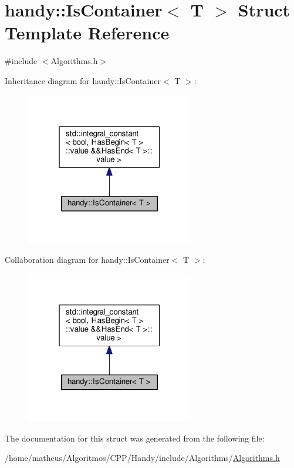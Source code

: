 \hypertarget{structhandy_1_1IsContainer}{}\section{handy\+:\+:Is\+Container$<$ T $>$ Struct Template Reference}
\label{structhandy_1_1IsContainer}


{\ttfamily \#include $<$Algorithms.\+h$>$}



Inheritance diagram for handy\+:\+:Is\+Container$<$ T $>$\+:\nopagebreak
\begin{figure}[H]
\begin{center}
\leavevmode
\includegraphics[width=208pt]{structhandy_1_1IsContainer__inherit__graph}
\end{center}
\end{figure}


Collaboration diagram for handy\+:\+:Is\+Container$<$ T $>$\+:\nopagebreak
\begin{figure}[H]
\begin{center}
\leavevmode
\includegraphics[width=208pt]{structhandy_1_1IsContainer__coll__graph}
\end{center}
\end{figure}


The documentation for this struct was generated from the following file\+:\begin{DoxyCompactItemize}
\item 
/home/matheus/\+Algoritmos/\+C\+P\+P/\+Handy/include/\+Algorithms/\hyperlink{Algorithms_8h}{Algorithms.\+h}\end{DoxyCompactItemize}
